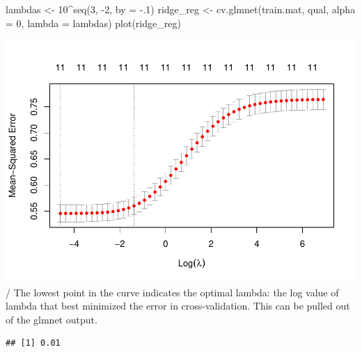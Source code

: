 \documentclass[
]{book}
\newenvironment{Shaded}{\begin{snugshade}}{\end{snugshade}}
\newcommand{\AttributeTok}[1]{\textcolor[rgb]{0.77,0.63,0.00}{#1}}
\newcommand{\DecValTok}[1]{\textcolor[rgb]{0.00,0.00,0.81}{#1}}
\newcommand{\FunctionTok}[1]{\textcolor[rgb]{0.00,0.00,0.00}{#1}}
\newcommand{\NormalTok}[1]{#1}
\newcommand{\OtherTok}[1]{\textcolor[rgb]{0.56,0.35,0.01}{#1}}
\newcommand{\SpecialCharTok}[1]{\textcolor[rgb]{0.00,0.00,0.00}{#1}}
\begin{document}
\begin{Shaded}
\begin{Highlighting}[]
\NormalTok{lambdas }\OtherTok{\textless{}{-}} \DecValTok{10}\SpecialCharTok{\^{}}\FunctionTok{seq}\NormalTok{(}\DecValTok{3}\NormalTok{, }\SpecialCharTok{{-}}\DecValTok{2}\NormalTok{, }\AttributeTok{by =} \SpecialCharTok{{-}}\NormalTok{.}\DecValTok{1}\NormalTok{)}
\NormalTok{ridge\_reg }\OtherTok{\textless{}{-}} \FunctionTok{cv.glmnet}\NormalTok{(train.mat, qual, }\AttributeTok{alpha =} \DecValTok{0}\NormalTok{, }\AttributeTok{lambda =}\NormalTok{ lambdas)}
\FunctionTok{plot}\NormalTok{(ridge\_reg)}
\end{Highlighting}
\end{Shaded}

\includegraphics{FinalProject-Bright-Santoro_files/figure-latex/unnamed-chunk-41-1.pdf}
/ The lowest point in the curve indicates the optimal lambda: the log value of lambda that best minimized the error in cross-validation. This can be pulled out of the glmnet output.

\begin{Shaded}
\end{Shaded}

\begin{verbatim}
## [1] 0.01
\end{verbatim}

\begin{Shaded}
\end{Shaded}
\end{document}
